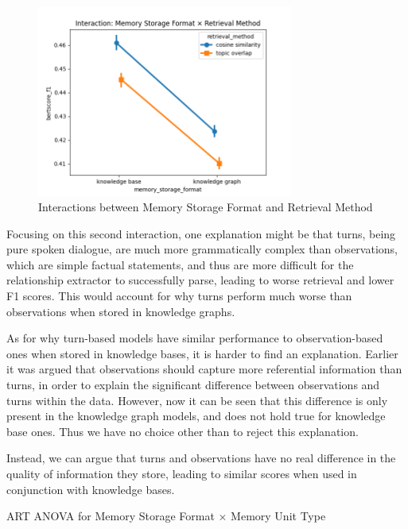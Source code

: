 \begin{figure}[p]
\centering
\includegraphics[width=0.75\textwidth]{charts/interaction_memory_storage_format_x_retrieval_method.png}
\caption{Interactions between Memory Storage Format and Retrieval Method}
\label{fig:interaction_memory_storage_format_x_retrieval_method}
\end{figure}


Focusing on this second interaction, one explanation might be that turns, being pure spoken dialogue, are much more grammatically complex than observations, which are simple factual statements, and thus are more difficult for the relationship extractor to successfully parse, leading to worse retrieval and lower F1 scores. This would account for why turns perform much worse than observations when stored in knowledge graphs. 

As for why turn-based models have similar performance to observation-based ones when stored in knowledge bases, it is harder to find an explanation. Earlier it was argued that observations should capture more referential information than turns, in order to explain the significant difference between observations and turns within the data. However, now it can be seen that this difference is only present in the knowledge graph models, and does not hold true for knowledge base ones. Thus we have no choice other than to reject this explanation. 

Instead, we can argue that turns and observations have no real difference in the quality of information they store, leading to similar scores when used in conjunction with knowledge bases.

\begin{table}[htbp]
\centering
\tiny

\caption{ART ANOVA for Memory Storage Format × Memory Unit Type}
\label{tab:memory_storage_format_x_memory_unit_type_table}
\end{table}


